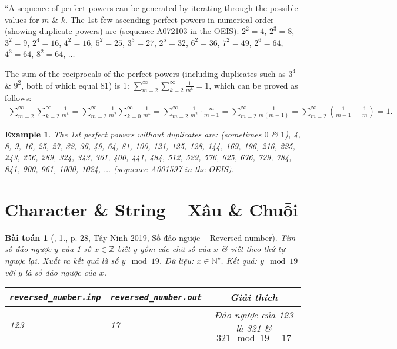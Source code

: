 \documentclass{article}
\newtheorem{baitoan}{Bài toán}
\newtheorem{example}{Example}
\begin{document}
``A sequence of perfect powers can be generated by iterating through the possible values for $m$ \& $k$. The 1st few ascending perfect powers in numerical order (showing duplicate powers) are (sequence \href{https://oeis.org/A072103}{A072103} in the \href{https://en.wikipedia.org/wiki/On-Line_Encyclopedia_of_Integer_Sequences}{OEIS}): $2^2 = 4$, $2^3 = 8$, $3^2 = 9$, $2^4 = 16$, $4^2 = 16$, $5^2 = 25$, $3^3 = 27$, $2^5 = 32$, $6^2 = 36$, $7^2 = 49$, $2^6 = 64$, $4^3 = 64$, $8^2 = 64$, $\ldots$

The sum of the reciprocals of the perfect powers (including duplicates such as $3^4$ \& $9^2$, both of which equal $81$) is 1: $\sum_{m=2}^\infty\sum_{k=2}^\infty \frac{1}{m^k} = 1$, which can be proved as follows:
\begin{align*}
	\sum_{m=2}^\infty\sum_{k=2}^\infty \frac{1}{m^k} = \sum_{m=2}^\infty \frac{1}{m^2}\sum_{k=0}^\infty \frac{1}{m^k} = \sum_{m=2}^\infty \frac{1}{m^2}\cdot\frac{m}{m - 1} = \sum_{m=2}^\infty \frac{1}{m(m - 1)} = \sum_{m=2}^\infty \left(\frac{1}{m - 1} - \frac{1}{m}\right) = 1.
\end{align*}

\begin{example}
	The 1st perfect powers without duplicates are: (sometimes $0$ \& $1$), \emph{4, 8, 9, 16, 25, 27, 32, 36, 49, 64, 81, 100, 121, 125, 128, 144, 169, 196, 216, 225, 243, 256, 289, 324, 343, 361, 400, 441, 484, 512, 529, 576, 625, 676, 729, 784, 841, 900, 961, 1000, 1024}, $\ldots$ (sequence \href{https://oeis.org/A001597}{A001597} in the \href{https://en.wikipedia.org/wiki/On-Line_Encyclopedia_of_Integer_Sequences}{OEIS}).
\end{example}


\section{Character \& String -- Xâu \& Chuỗi}

\begin{baitoan}[\cite{VietSTEM2021}, 1., p. 28, Tây Ninh 2019, Số đảo ngược -- Reversed number]
	Tìm số đảo ngược $y$ của 1 số $x\in\mathbb{Z}$ biết $y$ gồm các chữ số của $x$ \& viết theo thứ tự ngược lại. Xuất ra kết quả là số $y\mod19$. {\sf Dữ liệu:} $x\in\mathbb{N}^\star$. {\sf Kết quả:} $y\mod19$ với $y$ là số đảo ngược của $x$.
	\begin{table}[H]
		\centering
		\begin{tabular}{|l|l|c|}
			\hline
			\verb|reversed_number.inp| & \verb|reversed_number.out| & Giải thích \\
			\hline
			123 & 17 & Đảo ngược của 123 là 321 \& $321\mod19 = 17$ \\
			\hline
		\end{tabular}
	\end{table}
\end{baitoan}
\end{document}
